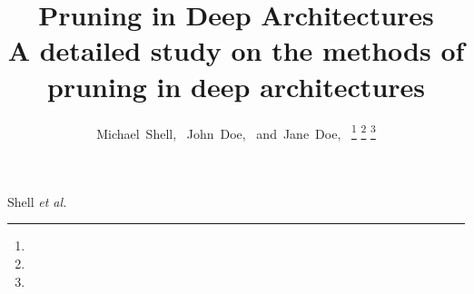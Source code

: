 \documentclass[journal]{IEEEtran}
\begin{document}
%
\title{Pruning in Deep Architectures \\
A detailed study on the methods of pruning in deep architectures }
%
%
%

\author{Michael~Shell,~
        John~Doe,~
        and~Jane~Doe,~%
\thanks{}%
\thanks{}%
\thanks{}}

% 
%



%
{Shell \MakeLowercase{\textit{et al.}}}
% 
\end{document}
